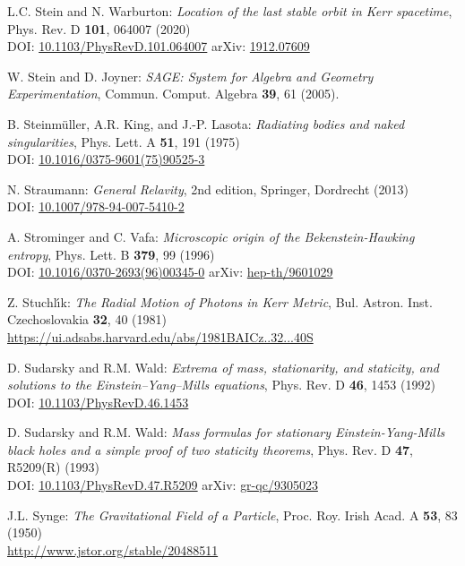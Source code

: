 \begin{thebibliography}{123}
L.C. Stein and N. Warburton:
{\em Location of the last stable orbit in Kerr spacetime},
Phys. Rev. D  {\bf 101}, 064007 (2020)\\
DOI: \href{https://doi.org/10.1103/PhysRevD.101.064007}{10.1103/PhysRevD.101.064007}\hfill
arXiv: \href{https://arxiv.org/abs/1912.07609}{1912.07609}

W. Stein and D. Joyner:
{\em SAGE: System for Algebra and Geometry Experimentation},
Commun. Comput. Algebra {\bf 39}, 61 (2005).

B. Steinmüller, A.R. King, and J.-P. Lasota:
{\em Radiating bodies and naked singularities},
Phys. Lett. A {\bf 51}, 191 (1975)\\
DOI: \href{https://doi.org/10.1016/0375-9601(75)90525-3}{10.1016/0375-9601(75)90525-3}

N. Straumann:
{\em General Relavity}, 2nd edition,
Springer, Dordrecht (2013)\\
DOI: \href{https://doi.org/10.1007/978-94-007-5410-2}{10.1007/978-94-007-5410-2}

A. Strominger and C. Vafa:
{\em Microscopic origin of the Bekenstein-Hawking entropy},
Phys. Lett. B {\bf 379}, 99 (1996)\\
DOI: \href{https://doi.org/10.1016/0370-2693(96)00345-0}{10.1016/0370-2693(96)00345-0}\hfill
arXiv: \href{https://arxiv.org/abs/hep-th/9601029}{hep-th/9601029}

Z. Stuchl\'{\i}k: {\em The Radial Motion of Photons in Kerr Metric},
Bul. Astron. Inst. Czechoslovakia {\bf 32}, 40 (1981)\\
\url{https://ui.adsabs.harvard.edu/abs/1981BAICz..32...40S}

D. Sudarsky and R.M. Wald: {\em Extrema of mass, stationarity, and staticity,
and solutions to the Einstein–Yang–Mills equations},
Phys. Rev. D {\bf 46}, 1453 (1992)\\
DOI: \href{https://doi.org/10.1103/PhysRevD.46.1453}{10.1103/PhysRevD.46.1453}

D. Sudarsky and R.M. Wald:
{\em Mass formulas for stationary Einstein-Yang-Mills black holes and a simple proof of two staticity theorems},
Phys. Rev. D {\bf 47}, R5209(R) (1993)\\
DOI: \href{https://doi.org/10.1103/PhysRevD.47.R5209}{10.1103/PhysRevD.47.R5209}\hfill
arXiv: \href{https://arxiv.org/abs/gr-qc/9305023}{gr-qc/9305023}

J.L. Synge: {\em The Gravitational Field of a Particle},
Proc. Roy. Irish Acad. A {\bf 53}, 83 (1950)\\
\url{http://www.jstor.org/stable/20488511}


\end{thebibliography}
